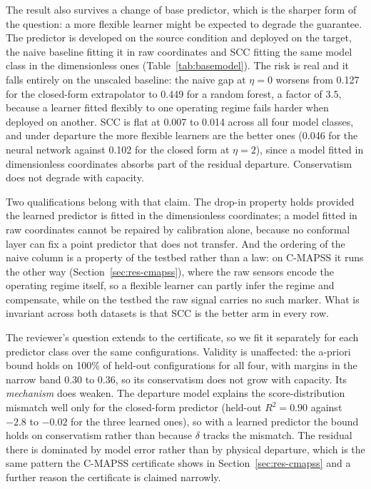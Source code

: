 The result also survives a change of base predictor, which is the sharper form of the question:
a more flexible learner might be expected to degrade the guarantee. The predictor is developed on
the source condition and deployed on the target, the naive baseline fitting it in raw coordinates
and SCC fitting the same model class in the dimensionless ones
(Table~\ref{tab:basemodel}). The risk is real and it falls entirely on the unscaled baseline: the
naive gap at $\eta=0$ worsens from 0.127 for the closed-form extrapolator to 0.449 for a random
forest, a factor of $3.5$, because a learner fitted flexibly to one operating regime fails harder
when deployed on another. SCC is flat at 0.007 to 0.014 across all four model classes, and under
departure the more flexible learners are the better ones (0.046 for the neural network against
0.102 for the closed form at $\eta=2$), since a model fitted in dimensionless coordinates absorbs
part of the residual departure. Conservatism does not degrade with capacity.

Two qualifications belong with that claim. The drop-in property holds provided the learned
predictor is fitted in the dimensionless coordinates; a model fitted in raw coordinates cannot be
repaired by calibration alone, because no conformal layer can fix a point predictor that does not
transfer. And the ordering of the naive column is a property of the testbed rather than a law: on
C-MAPSS it runs the other way (Section~\ref{sec:res-cmapss}), where the raw sensors encode the
operating regime itself, so a flexible learner can partly infer the regime and compensate, while on
the testbed the raw signal carries no such marker. What is invariant across both datasets is that
SCC is the better arm in every row.

The reviewer's question extends to the certificate, so we fit it separately for each predictor
class over the same configurations. Validity is unaffected: the a-priori bound holds on 100\% of
held-out configurations for all four, with margins in the narrow band 0.30 to 0.36, so its
conservatism does not grow with capacity. Its \emph{mechanism} does weaken. The departure model
explains the score-distribution mismatch well only for the closed-form predictor (held-out
$R^2=0.90$ against $-2.8$ to $-0.02$ for the three learned ones), so with a learned predictor the
bound holds on conservatism rather than because $\delta$ tracks the mismatch. The residual there is
dominated by model error rather than by physical departure, which is the same pattern the C-MAPSS
certificate shows in Section~\ref{sec:res-cmapss} and a further reason the certificate is claimed
narrowly.

